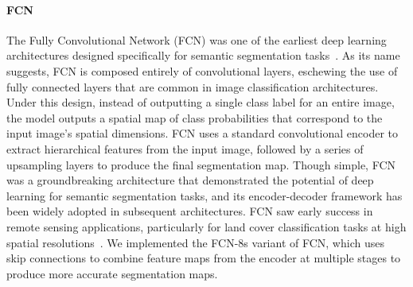 \paragraph{FCN}
The Fully Convolutional Network (FCN) was one of the earliest deep learning architectures designed specifically for semantic segmentation tasks~\citep{longFullyConvolutionalNetworks2015}.
As its name suggests, FCN is composed entirely of convolutional layers, eschewing the use of fully connected layers that are common in image classification architectures.
Under this design, instead of outputting a single class label for an entire image, the model outputs a spatial map of class probabilities that correspond to the input image's spatial dimensions.
FCN uses a standard convolutional encoder to extract hierarchical features from the input image, followed by a series of upsampling layers to produce the final segmentation map.
Though simple, FCN was a groundbreaking architecture that demonstrated the potential of deep learning for semantic segmentation tasks, and its encoder-decoder framework has been widely adopted in subsequent architectures.
FCN saw early success in remote sensing applications, particularly for land cover classification tasks at high spatial resolutions~\citep{sherrahFullyConvolutionalNetworks2016, volpiDenseSemanticLabeling2017, chenSymmetricalDenseShortcutDeep2018}.
We implemented the FCN-8s variant of FCN, which uses skip connections to combine feature maps from the encoder at multiple stages to produce more accurate segmentation maps.


